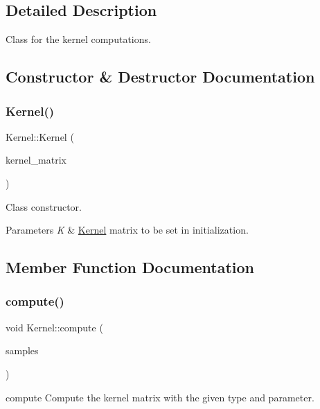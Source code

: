 \subsection{Detailed Description}
Class for the kernel computations. 

\subsection{Constructor \& Destructor Documentation}
\mbox{\label{class_kernel_adf23c1567adb8ddb5757931587320871}} 
\subsubsection{\texorpdfstring{Kernel()}{Kernel()}}
{\footnotesize\ttfamily Kernel\+::\+Kernel (\begin{DoxyParamCaption}\item[{d\+Matrix}]{kernel\+\_\+matrix }\end{DoxyParamCaption})}



Class constructor. 


\begin{DoxyParams}{Parameters}
{\em K} & \hyperlink{class_kernel}{Kernel} matrix to be set in initialization. \\
\hline
\end{DoxyParams}


\subsection{Member Function Documentation}
\mbox{\label{class_kernel_a5dfd3a6b535745eadd9e17dc086d87c6}} 
\subsubsection{\texorpdfstring{compute()}{compute()}}
{\footnotesize\ttfamily void Kernel\+::compute (\begin{DoxyParamCaption}\item[{\hyperlink{class_data}{Data}}]{samples }\end{DoxyParamCaption})}



compute Compute the kernel matrix with the given type and parameter. 


